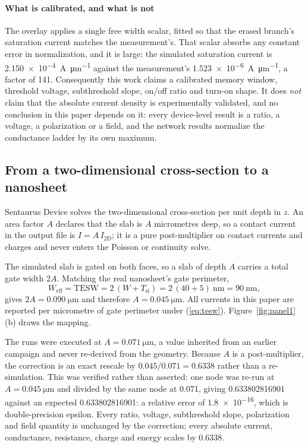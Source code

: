 \paragraph*{What is calibrated, and what is not}
The overlay applies a single free width scalar, fitted so that the erased branch's
saturation current matches the measurement's. That scalar absorbs any constant error in
normalization, and it is large: the simulated saturation current is
\SI{2.150e-4}{\ampere\per\micro\metre} against the measurement's
\SI{1.523e-6}{\ampere\per\micro\metre}, a factor of 141. Consequently this work claims a
calibrated memory window, threshold voltage, subthreshold slope, on/off ratio and
turn-on shape. It does \emph{not} claim that the absolute current density is
experimentally validated, and no conclusion in this paper depends on it: every
device-level result is a ratio, a voltage, a polarization or a field, and the network
results normalize the conductance ladder by its own maximum.

\subsection{From a two-dimensional cross-section to a nanosheet}
\label{sec:norm}

Sentaurus Device solves the two-dimensional cross-section per unit depth in $z$. An
area factor $A$ declares that the slab is $A$ micrometres deep, so a contact current
in the output file is $I=A\,I_\mathrm{2D}$; it is a pure post-multiplier on contact
currents and charges and never enters the Poisson or continuity solve.

The simulated slab is gated on both faces, so a slab of depth $A$ carries a total gate
width $2A$. Matching the real nanosheet's gate perimeter,
\begin{equation}
  W_\mathrm{eff} = \mathrm{TESW} = 2\,(W + T_\mathrm{si})
                 = 2\,(40 + 5)\ \mathrm{nm} = \SI{90}{\nano\metre},
  \label{eq:tesw}
\end{equation}
gives $2A = \SI{0.090}{\micro\metre}$ and therefore $A=\SI{0.045}{\micro\metre}$.
All currents in this paper are reported per micrometre of gate perimeter under
(\ref{eq:tesw}). Figure~\ref{fig:panel1}(b) draws the mapping.

The runs were executed at $A=\SI{0.071}{\micro\metre}$, a value inherited from an
earlier campaign and never re-derived from the geometry. Because $A$ is a post-multiplier,
the correction is an exact rescale by $0.045/0.071=0.6338$ rather than a re-simulation.
This was verified rather than asserted: one node was re-run at $A=\SI{0.045}{\micro\metre}$
and divided by the same node at \num{0.071}, giving \num{0.633802816901} against an
expected \num{0.633802816901}: a relative error of \num{1.8e-16}, which is
double-precision epsilon. Every ratio, voltage, subthreshold slope, polarization and
field quantity is unchanged by the correction; every absolute current, conductance,
resistance, charge and energy scales by \num{0.6338}.

